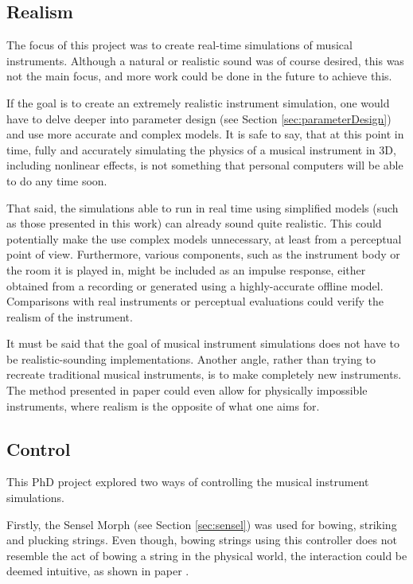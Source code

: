 \subsection{Realism}\label{sec:realism}
The focus of this project was to create real-time simulations of musical instruments. Although a natural or realistic sound was of course desired, this was not the main focus, and more work could be done in the future to achieve this.

If the goal is to create an extremely realistic instrument simulation, one would have to delve deeper into parameter design (see Section \ref{sec:parameterDesign}) and use more accurate and complex models. It is safe to say, that at this point in time, fully and accurately simulating the physics of a musical instrument in 3D, including nonlinear effects, is not something that personal computers will be able to do any time soon. 

That said, the simulations able to run in real time using simplified models (such as those presented in this work) can already sound quite realistic. This could potentially make the use complex models unnecessary, at least from a perceptual point of view. Furthermore, various components, such as the instrument body or the room it is played in, might be included as an impulse response, either obtained from a recording or generated using a highly-accurate offline model. Comparisons with real instruments or perceptual evaluations could verify the realism of the instrument.

It must be said that the goal of musical instrument simulations does not have to be realistic-sounding implementations. Another angle, rather than trying to recreate traditional musical instruments, is to make completely new instruments. The method presented in paper \citeP[G] could even allow for physically impossible instruments, where realism is the opposite of what one aims for.

\subsection{Control}
This PhD project explored two ways of controlling the musical instrument simulations. 

Firstly, the Sensel Morph (see Section \ref{sec:sensel}) was used for bowing, striking and plucking strings. Even though, bowing strings using this controller does not resemble the act of bowing a string in the physical world, the interaction could be deemed intuitive, as shown in paper \citeP[A].

